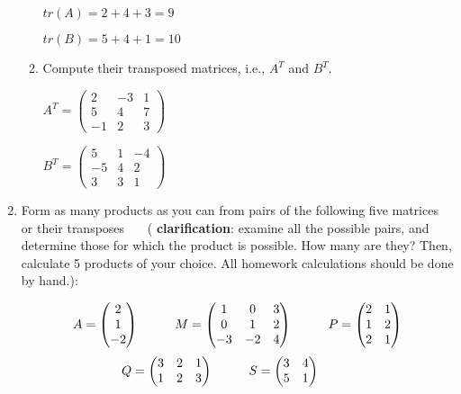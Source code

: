 \documentclass[fleqn]{article}
\begin{document}
\begin{enumerate}
\begin{enumerate}
  $
  tr(A)=2+4+3=9
  $
  
  $
  tr(B)=5+4+1=10
  $
  
  \item  Compute their transposed matrices, i.e., $A^T$ and $B^T$. 
  
  \noindent
  $A^T=
  \begin{pmatrix}
    2 & -3 & 1 \\
    5 & 4 & 7 \\
    -1 & 2 & 3
  \end{pmatrix}
  $
  
  \noindent
  $B^T=
  \begin{pmatrix}
    5 & 1 & -4 \\
    -5 & 4 & 2 \\
    3 & 3 & 1
  \end{pmatrix}
  $
  
  \end{enumerate}
  
  \item Form as many products as you can from pairs of the following five matrices or their transposes ~~~( {\bf clarification}: examine all the possible pairs, and determine those for which the product is possible. How many are they?  Then, calculate 5 products of your choice. All homework calculations should be done by hand.): 
  
  $$A=\begin{pmatrix}
    2  \\
    1  \\
    -2 
    \end{pmatrix} \hskip 1truecm M=\begin{pmatrix}
    1 & 0 & 3 \\
    0 & 1 & 2 \\
    -3 & -2 & 4
    \end{pmatrix}\hskip 1truecm P=\begin{pmatrix}
      2 & 1  \\
      1 & 2  \\
      2 & 1 
      \end{pmatrix}
    $$ 
    $$Q=\begin{pmatrix}
      3 & 2 & 1 \\
      1 & 2 & 3 \\
      \end{pmatrix} \hskip 1truecm S=\begin{pmatrix}
      3 & 4 \\
      5 & 1 \\
      \end{pmatrix}\hskip 1truecm
    $$ 


\end{enumerate}
\end{document}
